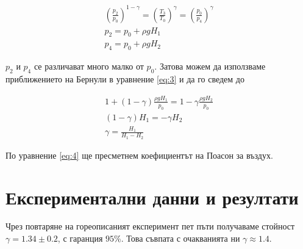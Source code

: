 \documentclass[%
 reprint,
 amsmath,amssymb,
 aps,
]{revtex4-2}
\begin{document}
\begin{gather*}
    (\frac{p_2}{p_0})^{1 - \gamma} = (\frac{T_3}{T_0})^{\gamma} = (\frac{p_0}{p_4})^{\gamma} \label{eq:3} \tag{3}\\
    p_2 = p_0 + \rho g H_1 \\
    p_4 = p_0 + \rho g H_2
\end{gather*}

$p_2$ и $p_4$ се различават много малко от $p_0$. Затова можем да използваме приближението на Бернули в уравнение \eqref{eq:3} и да го сведем до 

\begin{gather*}
    1 + (1 - \gamma) \frac{\rho g H_1}{p_0} = 1 - \gamma \frac{\rho g H_2}{p_0} \\
    (1 - \gamma) H_1 = -\gamma H_2 \\
    \gamma = \frac{H_1}{H_1 - H_2} \label{eq:4} \tag{4}
\end{gather*}

По уравнение \eqref{eq:4} ще пресметнем коефициентът на Поасон за въздух. 
\section{Експериментални данни и резултати}

Чрез повтаряне на гореописаният експеримент пет пъти получаваме стойност $\gamma = 1.34 \pm 0.2$, с гаранция $95 \%$. Това съвпата с очакванията ни $\gamma \approx 1.4$.
\end{document}
